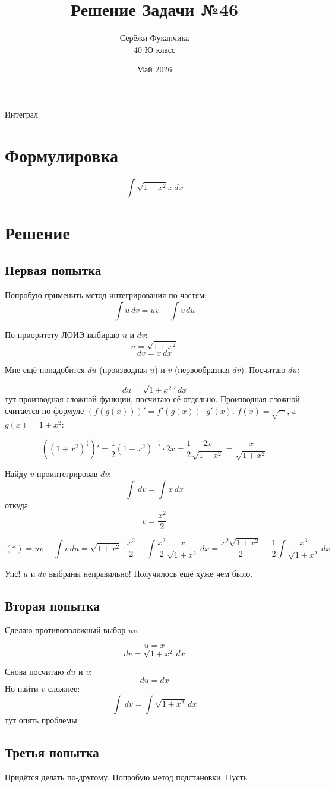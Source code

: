 \documentclass{article}
\title{Решение Задачи №46}
\author{Серёжи Фуканчика\\40 Ю класс}
\date{Май 2026}
\begin{document}
\maketitle
Интеграл
\section{Формулировка}
\[
\int \sqrt{1+x^2}x \,dx
\]

\section{Решение}
\subsection{Первая попытка}
Попробую применить метод интегрирования по частям:
\[
\int u \,dv=uv-\int v \,du
\]

По приоритету ЛОИЭ выбираю $u$ и $dv$:
\[
u=\sqrt{1+x^2}
\]
\[
dv=x \,dx
\]

Мне ещё понадобится $du$ (производная $u$) и $v$ (первообразная $dv$). Посчитаю $du$:

\[
du=\sqrt{1+x^2}'\,dx
\]
тут производная сложной функции, посчитаю её отдельно. Производная сложной считается по формуле $(f(g(x)))'=f'(g(x))\cdot{}g'(x)$. $f(x)=\sqrt{\cdots}$, а $g(x)=1+x^2$:

\[
\left({{(1+x^{2})}^{\frac{1}{2}}}\right)' = \frac{1}{2}{(1+x^2)}^{-\frac{1}{2}}\cdot{}2x=\frac{1}{2}\frac{2x}{\sqrt{1+x^2}}=\frac{x}{\sqrt{1+x^2}}
\]

Найду $v$ проинтегрировав $dv$:
\[
\int \,dv=\int x \,dx
\]
откуда
\[
v=\frac{x^2}{2}
\]

\[
(*)=uv-\int v \,du=\sqrt{1+x^2}\cdot\frac{x^2}{2}-\int \frac{x^2}{2} \frac{x}{\sqrt{1+x^2}} \,dx=\frac{x^2{}\sqrt{1+x^2}}{2}-\frac{1}{2}\int \frac{x^3}{\sqrt{1+x^2}} \,dx
\]

{\color{red}Упс! $u$ и $dv$ выбраны неправильно!} Получилось ещё хуже чем было.

\subsection{Вторая попытка}
Сделаю противоположный выбор $uv$:

\[
u=x
\]
\[
dv=\sqrt{1+x^2} \,dx
\]

Снова посчитаю $du$ и $v$:
\[
du=dx
\]
Но найти $v$ сложнее:
\[
\int \,dv=\int \sqrt{1+x^2} \,dx
\]
тут опять проблемы.

\subsection{Третья попытка}
Придётся делать по-другому. Попробую метод подстановки. Пусть
\end{document}
